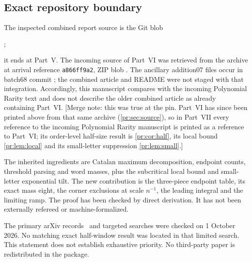 \documentclass[11pt,a4paper]{article}
\theoremstyle{definition}\newaliascnt{definition}{theorem}
\theoremstyle{remark}\newaliascnt{remark}{theorem}
\begin{document}
\subsection{Exact repository boundary}
\label{hc:sec:boundary}
The inspected combined report source is the Git blob
\begin{center}\small{};\end{center}
\noindent it ends at Part~V. The
incoming source of Part~VI was retrieved from the archive at arrival
reference \texttt{a866ff9a2}, ZIP blob
. The ancillary addition07
files occur in batch68 commit
; the combined article and
README were not staged with that integration. Accordingly, this manuscript
compares with the incoming Polynomial Rarity text and does not describe the
older combined article as already containing Part~VI. [Merge note: this was
true at the pin. Part~VI has since been printed above from that same archive
(\cref{pr:sec:source}), so in Part~VII every reference to the incoming
Polynomial Rarity manuscript is printed as a reference to Part~VI; its
order-level half-size result is \cref{pr:cor:half}, its local bound
\cref{pr:lem:local} and its small-letter suppression \cref{pr:lem:small}.]

The inherited ingredients are Catalan maximum decomposition, endpoint counts,
threshold parsing and word masses, plus the subcritical local bound and
small-letter exponential tilt. The new contribution is the three-piece
endpoint table, its exact mass eight, the corner exclusions at scale
$n^{-1}$, the leading integral and the limiting ramp. The proof has been
checked by direct derivation. It has not been externally refereed or
machine-formalized.

The primary arXiv records~\cite{Nadler,MayamaAkita,pr:KerriouMorters} and
targeted searches were checked on 1 October 2026. No matching exact
half-window result was located in that limited search. This statement does
not establish exhaustive priority. No third-party paper is redistributed in
the package.
\end{document}
